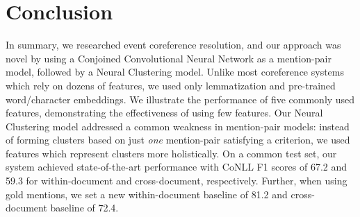 \documentclass[11pt,a4paper]{article}
\begin{document}
\section{Conclusion}
In summary, we researched event coreference resolution, and our approach was novel by using a Conjoined Convolutional Neural Network as a mention-pair model, followed by a Neural Clustering model.  Unlike most coreference systems which rely on dozens of features, we used only lemmatization and pre-trained word/character embeddings.  We illustrate the performance of five commonly used features, demonstrating the effectiveness of using few features.  Our Neural Clustering model addressed a common weakness in mention-pair models: instead of forming clusters based on just \textit{one} mention-pair satisfying a criterion, we used features which represent clusters more holistically.  On a common test set, our system achieved state-of-the-art performance with CoNLL F1 scores of 67.2 and 59.3 for within-document and cross-document, respectively.  Further, when using gold mentions, we set a new within-document baseline of 81.2 and cross-document baseline of 72.4.

%
%



\appendix
\end{document}
